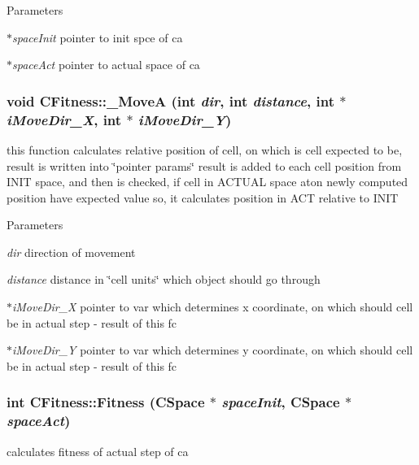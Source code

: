 \begin{DoxyParams}{Parameters}
\item[{\em $\ast$spaceInit}]pointer to init spce of ca \item[{\em $\ast$spaceAct}]pointer to actual space of ca \end{DoxyParams}
\hypertarget{classCFitness_aa499673546171eaac6a42ddcfa59b808}{
\subsubsection[{\_\-MoveA}]{\setlength{\rightskip}{0pt plus 5cm}void CFitness::\_\-MoveA (int {\em dir}, \/  int {\em distance}, \/  int $\ast$ {\em iMoveDir\_\-X}, \/  int $\ast$ {\em iMoveDir\_\-Y})}}
\label{classCFitness_aa499673546171eaac6a42ddcfa59b808}
this function calculates relative position of cell, on which is cell expected to be, result is written into \char`\"{}pointer params\char`\"{} result is added to each cell position from INIT space, and then is checked, if cell in ACTUAL space aton newly computed position have expected value so, it calculates position in ACT relative to INIT


\begin{DoxyParams}{Parameters}
\item[{\em dir}]direction of movement \item[{\em distance}]distance in \char`\"{}cell units\char`\"{} which object should go through \item[{\em $\ast$iMoveDir\_\-X}]pointer to var which determines x coordinate, on which should cell be in actual step -\/ result of this fc \item[{\em $\ast$iMoveDir\_\-Y}]pointer to var which determines y coordinate, on which should cell be in actual step -\/ result of this fc \end{DoxyParams}
\hypertarget{classCFitness_a0f4e219fd31fab1f3a90baf4101ab133}{
\subsubsection[{Fitness}]{\setlength{\rightskip}{0pt plus 5cm}int CFitness::Fitness ({\bf CSpace} $\ast$ {\em spaceInit}, \/  {\bf CSpace} $\ast$ {\em spaceAct})}}
\label{classCFitness_a0f4e219fd31fab1f3a90baf4101ab133}
calculates fitness of actual step of ca


